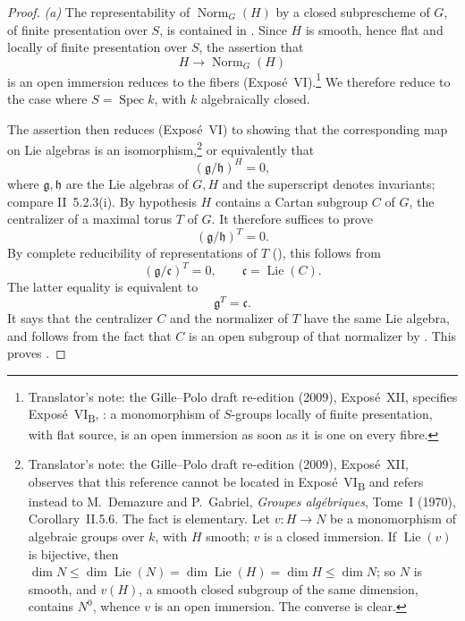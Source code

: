\begin{proof}
\emph{(a)} The representability of \(\operatorname{Norm}_G(H)\) by
a closed subprescheme of \(G\), of finite presentation over \(S\),
is contained in . Since \(H\) is smooth, hence flat and
locally of finite presentation over \(S\), the assertion that
\[
  H\longrightarrow\operatorname{Norm}_G(H)
\]
is an open immersion reduces to the fibers (Exposé~VI).\footnote{Translator's
note: the Gille--Polo draft re-edition (2009), Exposé~XII, specifies
Exposé~VI\textsubscript{B}, : a monomorphism of
\(S\)-groups locally of finite presentation, with flat source, is an open
immersion as soon as it is one on every fibre.} We therefore reduce to the case
where \(S=\operatorname{Spec}k\), with \(k\) algebraically closed.

The assertion then reduces (Exposé~VI) to showing that the corresponding map on
Lie algebras is an isomorphism,\footnote{Translator's note: the Gille--Polo
draft re-edition (2009), Exposé~XII, observes that this reference cannot be
located in Exposé~VI\textsubscript{B} and refers instead to M.~Demazure and
P.~Gabriel, \emph{Groupes algébriques}, Tome~I (1970), Corollary~II.5.6.
The fact is elementary. Let \(v\colon H\to N\) be a monomorphism of algebraic
groups over \(k\), with \(H\) smooth; \(v\) is a closed immersion. If
\(\operatorname{Lie}(v)\) is bijective, then \(\dim N\leq\dim
\operatorname{Lie}(N)=\dim\operatorname{Lie}(H)=\dim H\leq\dim N\); so
\(N\) is smooth, and \(v(H)\), a smooth closed subgroup of the same
dimension, contains \(N^0\), whence \(v\) is an open immersion. The converse
is clear.} or equivalently that
\[
  (\mathfrak g/\mathfrak h)^H=0,
\]
where \(\mathfrak g,\mathfrak h\) are the Lie algebras of \(G,H\)
and the superscript denotes invariants; compare II~5.2.3(i). By
hypothesis \(H\) contains a Cartan subgroup \(C\) of \(G\), the
centralizer of a maximal torus \(T\) of \(G\). It therefore suffices
to prove
\[
  (\mathfrak g/\mathfrak h)^T=0.
\]
By complete reducibility of representations of \(T\)
(), this follows from
\[
  (\mathfrak g/\mathfrak c)^T=0,
  \qquad \mathfrak c=\operatorname{Lie}(C).
\]
The latter equality is equivalent to
\[
  \mathfrak g^T=\mathfrak c.
\]
It says that the centralizer \(C\) and the normalizer of \(T\) have
the same Lie algebra, and follows from the fact that \(C\) is an
open subgroup of that normalizer by . This proves
\textup{}.


\end{proof}
